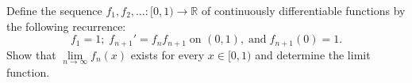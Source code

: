 \documentclass{article}
\begin{document}
\setlength{\parindent}{0pt}
Define the sequence $f_1,f_2,\ldots:[0,1)\to \mathbb{R}$ of continuously differentiable functions by the following recurrence:$$
f_1=1;\;f_{n+1}'=f_nf_{n+1}\;\text{on $(0,1)$},\;\text{and}\;f_{n+1}(0)=1.
$$Show that $\lim\limits_{n\to \infty}f_n(x)$ exists for every $x\in [0,1)$ and determine the limit function.
\end{document}
